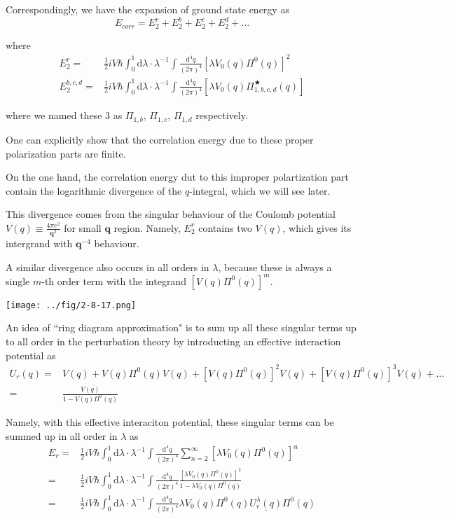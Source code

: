 Correspondingly, we have the expansion of ground state energy as
\[E_{corr} = E_2^r + E_2^b + E_2^c + E_2^d+\ldots\]

where
\[\begin{split}E_2^r =& \frac{1}{2}i V \hbar \int_0^1 \mathrm{d} \lambda \cdot \lambda^{-1} \int \frac{\mathrm{d}^4 q}{(2\pi)^4} \left[ \lambda V_0(q)\Pi^0(q) \right]^2\\
E_2^{b,c,d} =& \frac{1}{2}i V \hbar \int_0^1 \mathrm{d} \lambda \cdot \lambda^{-1} \int \frac{\mathrm{d}^4 q}{(2\pi)^4} \left[ \lambda V_0(q)\Pi^\bigstar_{1,b,c,d}(q) \right]
 \end{split}\]

where we named these 3 as $\Pi_{1,b}$, $\Pi_{1,c}$, $\Pi_{1,d}$ respectively.

One can explicitly show that the correlation energy due to these proper polarization parts are finite.

On the one hand, the correlation energy dut to this improper polartization part contain the logarithmic divergence of the $q$-integral, which we will see later.

This divergence comes from the singular behaviour of the Coulomb potential $V(q)\equiv \frac{4\pi e^2}{\mathbf{q}^2}$ for small $\mathbf{q}$ region. Namely, $E_2^r$ contains two $V(q)$, which gives its intergrand with $\mathbf{q}^{-4}$ behaviour.

A similar divergence also occurs in all orders in $\lambda$, because these is always a single $m$-th order term with the integrand $\left[ V(q) \Pi^0(q) \right]^m$.

\begin{center} \label{Fig2.8.17}
\texttt{[image: ../fig/2-8-17.png]}
\end{center}

An idea of ``ring diagram approximation" is to sum up all these singular terms up to all order in the perturbation theory by introducting an effective interaction potential as
\[\begin{split} U_r(q) =& V(q) + V(q)\Pi^0(q) V(q) + [V(q)\Pi^0(q)]^2 V(q) + [V(q)\Pi^0(q)]^3 V(q) + \ldots \\ 
=& \frac{V(q)}{1-V(q)\Pi^0(q)}
\end{split}\]

Namely, with this effective interaciton potential, these singular terms can be summed up in all order in $\lambda$ as
\begin{equation} \label{Eqs2.8.9} \begin{split}
E_r =& \frac{1}{2}i V\hbar \int_0^1 \mathrm{d} \lambda \cdot \lambda^{-1} \int \frac{\mathrm{d}^4 q}{(2\pi)^4} \sum_{n=2}^\infty [ \lambda V_0(q) \Pi^0(q) ]^n\\
=& \frac{1}{2}i V\hbar \int_0^1 \mathrm{d} \lambda \cdot \lambda^{-1} \int \frac{\mathrm{d}^4 q}{(2\pi)^4} \frac{[\lambda V_0(q) \Pi^0(q)]^2}{1-\lambda V_0(q) \Pi^0(q)}\\
=& \frac{1}{2}i V\hbar \int_0^1 \mathrm{d} \lambda \cdot \lambda^{-1} \int \frac{\mathrm{d}^4 q}{(2\pi)^4} \lambda V_0(q) \Pi^0(q) \underline{U_r^\lambda(q)} \Pi^0(q)
\end{split}\end{equation}

